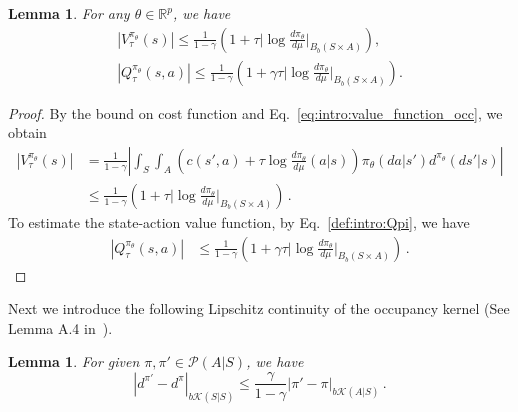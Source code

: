 \documentclass{amsart}
\newtheorem{lemma}[theorem]{Lemma}
\theoremstyle{definition}
\begin{document}
\begin{lemma}\label{lem:bounds}
For any $\theta \in \mathbb{R}^p$, we have
\begin{gather*}
\left|V^{\pi_\theta}_{\tau}(s)\right|\le \frac{1}{1-\gamma} \left(1+\tau \bigg|\log \frac{d\pi_{\theta}}{d \mu}\bigg|_{B_b(S \times A)} \right),\\
|Q^{\pi_{\theta}}_{\tau}(s,a)| \le \frac{1}{1-\gamma} \left(1+\gamma\tau \bigg|\log \frac{d\pi_{\theta}}{d \mu}\bigg|_{B_b(S \times A)} \right).
\end{gather*}
\end{lemma}
\begin{proof}

By the bound on cost function and Eq.~\eqref{eq:intro:value_function_occ}, we obtain
\begin{equation}\label{eq:bound_on_V_pi}
\begin{aligned}
|V^{\pi_\theta}_{\tau}(s)|&=\frac{1}{1-\gamma}\left|\int_{S}\int_A \left(c(s',a)+\tau \log \frac{d\pi_{\theta}}{d\mu}(a|s)\right)\pi_{\theta}(da|s')d^{\pi_\theta}(ds'|s)\right|\\
&\le \frac{1}{1-\gamma} \left(1+\tau \bigg|\log \frac{d\pi_{\theta}}{d \mu}\bigg|_{B_b(S \times A)} \right)\,.
\end{aligned}
\end{equation}
To estimate the state-action value function, by Eq.~\eqref{def:intro:Qpi}, we have
\begin{align*}
|Q^{\pi_{\theta}}_{\tau}(s,a)| &\le \frac{1}{1-\gamma} \left(1+\gamma\tau \bigg|\log \frac{d\pi_{\theta}}{d \mu}\bigg|_{B_b(S \times A)} \right)\,.
\end{align*}
\end{proof}

Next we introduce the following Lipschitz continuity of the occupancy kernel (See Lemma A.4 in~\cite{leahy2022convergence}). 
\begin{lemma}\label{lem:app:mdp:lip_occ_kernel}
For given $\pi,\pi' \in \mathcal{P}(A|S)$, we have
\[
|d^{\pi'}-d^{\pi}|_{b\mathcal{K}(S|S)}\le \frac{\gamma}{1-\gamma}|\pi'-\pi|_{b\mathcal{K}(A|S)}\,.
\]
\end{lemma}
\end{document}
